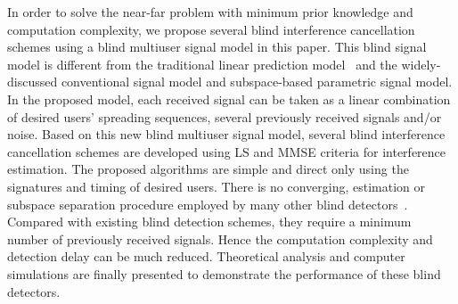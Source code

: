 \documentclass[a4paper,10pt,fleqn, twocolumn]{IEEETran}
\begin{document}
In order to solve the near-far problem with minimum prior
knowledge and computation complexity, we propose several blind
interference cancellation schemes using a blind multiuser signal
model in this paper. This blind signal model is different from the
traditional linear prediction model~\cite{Haykin96} and the
widely-discussed conventional signal model and subspace-based
parametric signal model. In the proposed model, each received
signal can be taken as a linear combination of desired users'
spreading sequences, several previously received signals and/or
noise. Based on this new blind multiuser signal model, several
blind interference cancellation schemes are developed using LS and
MMSE criteria for interference estimation. The proposed algorithms
are simple and direct only using the signatures and timing of
desired users. There is no converging, estimation or subspace
separation procedure employed by many other blind
detectors~\cite{Madh94,Honi95,Wang98,Wang99}. Compared with
existing blind detection schemes, they require a minimum number of
previously received signals. Hence the computation complexity and
detection delay can be much reduced. Theoretical analysis and
computer simulations are finally presented to demonstrate the
performance of these blind detectors.
\end{document}
